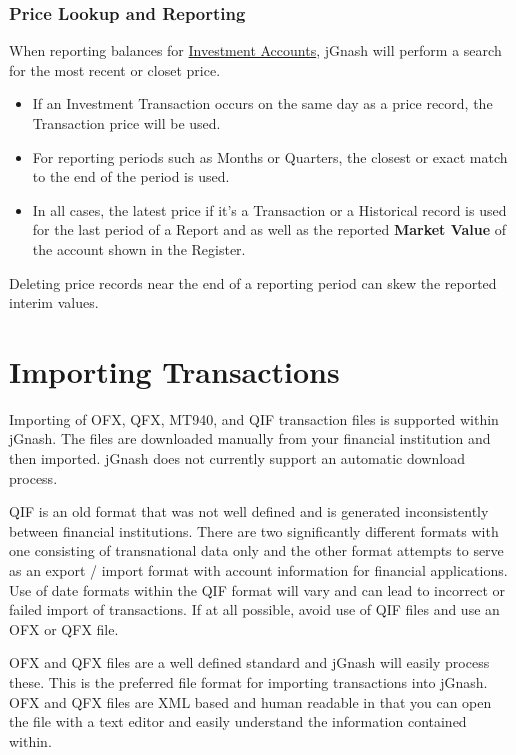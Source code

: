 \documentclass[letterpaper,12pt]{book}
\begin{document}
    \newpage   
    \subsection{Price Lookup and Reporting}
    \label{sec:pricelookup}
           
    When reporting balances for \hyperref[sub:investaccount]{Investment Accounts}, jGnash will perform a search
    for the most recent or closet price.
        
    \begin{itemize}
        \item If an Investment Transaction occurs on the same day as a price record, the Transaction price will be used.
        \item For reporting periods such as Months or Quarters, the closest or exact match to the end of the period is used.
        \item  In all cases, the latest price if it's a Transaction or a Historical record is used for the last period 
        of a Report and as well as the reported \textbf{Market Value} of the account shown in the Register.      
    \end{itemize}
      
    Deleting price records near the end of a reporting period can skew the reported interim values.

    \chapter{Importing Transactions}
    Importing of OFX, QFX, MT940, and QIF transaction files is supported within jGnash.
    The files are downloaded manually from your financial institution and then imported.
    jGnash does not currently support an automatic download process.

    QIF is an old format that was not well defined and is generated inconsistently between financial institutions.
    There are two significantly different formats with one consisting of transnational data only and the other format
    attempts to serve as an export / import format with account information for financial applications.
    Use of date formats within the QIF format will vary and can lead to incorrect or failed import of transactions.
    If at all possible, avoid use of QIF files and use an OFX or QFX file.

    OFX and QFX files are a well defined standard and jGnash will easily process these.
    This is the preferred file format for importing transactions into jGnash.
    OFX and QFX files are XML based and human readable in that you can open the file
    with a text editor and easily understand the information contained within.
\end{document}
